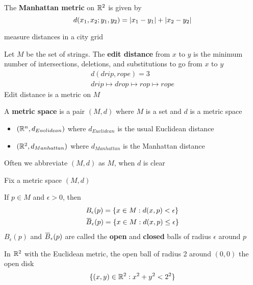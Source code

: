 \documentclass[11pt]{article}
\begin{document}
\begin{examplle}[]
The \textbf{Manhattan metric} on \(\mathbb{R}^2\) is given by
\begin{equation*}
  d(x_1,x_2;y_1,y_2)=\abs{x_1-y_1}+\abs{x_2-y_2}
\end{equation*}

measure distances in a city grid
\end{examplle}

\begin{examplle}[]
Let \(M\) be the set of strings. The \textbf{edit distance} from \(x\) to \(y\) is the minimum number of
intersections, deletions, and substitutions to go from \(x\) to \(y\)
\begin{gather*}
  d(drip,rope)=3\\
  drip\mapsto drop\mapsto rop\mapsto rope
\end{gather*}
Edit distance is a metric on \(M\)
\end{examplle}

\begin{definition}[]
A \textbf{metric space} is a pair \((M,d)\) where \(M\) is a set and \(d\) is a metric space
\end{definition}

\begin{itemize}
\item \((\mathbb{R}^n,d_{Euclidean})\) where \(d_{Euclidean}\) is the usual Euclidean distance
\item \((\mathbb{R}^2,d_{Manhattan})\) where \(d_{Manhattan}\) is the Manhattan distance
\end{itemize}


Often we abbreviate \((M,d)\) as \(M\), when \(d\) is clear

Fix a metric space \((M,d)\)

\begin{definition}[]
If \(p\in M\) and \(\epsilon>0\), then
\begin{align*}
&B_\epsilon(p)=\{x\in M:d(x,p)<\epsilon\}\\
&\barB_\epsilon(p)=\{x\in M:d(x,p)\le\epsilon\}\\
\end{align*}
\(B_\epsilon(p)\) and \(\barB_\epsilon(p)\) are called the \textbf{open} and \textbf{closed} balls of radius \(\epsilon\) around \(p\)
\end{definition}

\begin{examplle}[]
In \(\mathbb{R}^2\) with the Euclidean metric, the open ball of radius 2 around \((0,0)\) the open disk
\begin{equation*}
\{(x,y)\in\mathbb{R}^2:x^2+y^2<2^2\}
\end{equation*}
\end{examplle}
\end{document}
